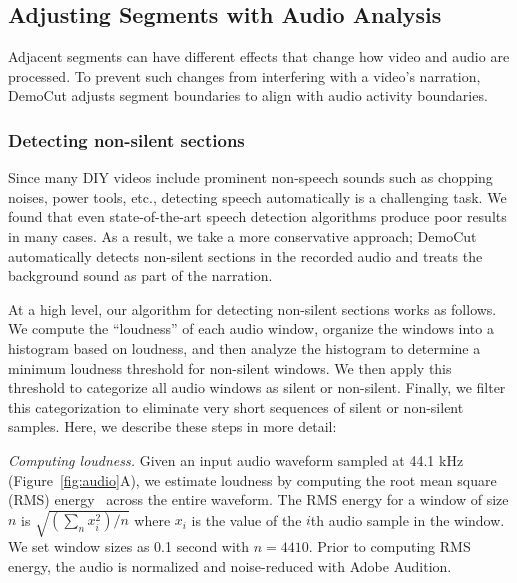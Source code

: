 \subsection{Adjusting Segments with Audio Analysis}

Adjacent segments can have different effects that change how video and audio are processed. To prevent such changes from interfering with a video's narration, DemoCut adjusts segment boundaries to align with audio activity boundaries.

\subsubsection{Detecting non-silent sections}
%
Since many DIY videos include prominent non-speech sounds such as
chopping noises, power tools, etc., detecting speech automatically is
a challenging task. We found that even state-of-the-art speech
detection algorithms produce poor results in many cases.
%
As a result, we take a more conservative approach; DemoCut
automatically detects non-silent sections in the recorded
audio and treats the background sound as part of the narration.

At a high level, our algorithm for detecting non-silent sections works
as follows. We compute the ``loudness'' of each audio window,
organize the windows into a histogram based on loudness, and then
analyze the histogram to determine a minimum loudness threshold for
non-silent windows. We then apply this threshold to categorize all
audio windows as silent or non-silent. Finally, we filter this
categorization to eliminate very short sequences of silent or non-silent samples. Here, we describe these steps in more detail:

\emph{Computing loudness.} Given an input audio waveform sampled at
44.1 kHz (Figure~\ref{fig:audio}A), we estimate loudness by computing
the root mean square (RMS) energy~\cite{Panagiotakis:2005eb} across
the entire waveform. The RMS energy
for a window of size $n$ is $\sqrt{(\sum_{n}{x_i^2})/n}$ where $x_i$ is the value of
the $i$th audio sample in the window. We set window sizes as 0.1 second with $n = 4410$. Prior to computing RMS energy, the audio is normalized and noise-reduced with Adobe Audition.

